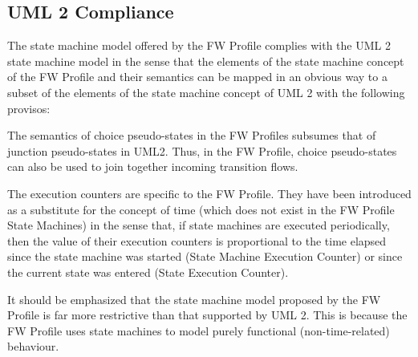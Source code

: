 \subsection{UML 2 Compliance}
The state machine model offered by the FW Profile complies with the UML 2 state machine
model in the sense that the elements of the state machine concept of the FW Profile and their
semantics can be mapped in an obvious way to a subset of the elements of the state machine
concept of UML 2 with the following provisos:

\begin{fw_itemize}
\item The semantics of choice pseudo-states in the FW Profiles subsumes that of junction pseudo-states
in UML2. Thus, in the FW Profile, choice pseudo-states can also be used to join together incoming
transition flows.
\item The execution counters are specific to the FW Profile. They have been introduced as a
substitute for the concept of time (which does not exist in the FW Profile State Machines) in
the sense that, if state machines are executed periodically, then the value of their execution 
counters is proportional to the time elapsed since the state machine was started (State Machine
Execution Counter) or since the current state was entered (State Execution Counter). 
\end{fw_itemize}

It should be emphasized that the state machine model proposed by the FW Profile is far more
restrictive than that supported by UML 2. This is because the FW Profile uses state machines
to model purely functional (non-time-related) behaviour.


